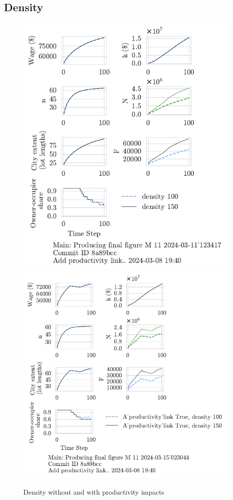 \newpage
\subsection{Density}
\begin{figure}[h!tb] 
    \centering
    \includegraphics[scale=.75, trim={0 1.4cm 1.5cm 0},clip]{fig/density-Main-123417.pdf} 
    \includegraphics[scale=.75, trim={0 1.4cm 3.2cm 0},clip]{fig/With-productivity_link-density-023044.pdf} 
    \caption{Density without and with productivity impacts}
    \label{fig:Productivity_link_W-WO-density}
\end{figure}
